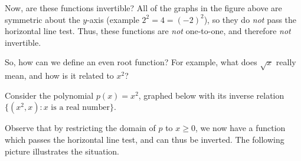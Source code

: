 \documentclass{ximera}
\begin{document}
Now, are these functions invertible? All of the graphs in the figure above are symmetric about the $y$-axis (example $2^2 = 4 = (-2)^2$), so they do {\em not} pass the horizontal line test. Thus, these functions are {\em not} one-to-one, and therefore {\em not} invertible.

So, how can we define an even root function? For example, what does $\sqrt{x}$ really mean, and how is it related to $x^2$?

Consider the polynomial $p(x)=x^2$, graphed below with its inverse relation $\{(x^2, x): x \text{ is a real number}\}$.
\begin{image}
\end{image}

Observe that by restricting the domain of $p$ to $x \geq 0$, we now have a function which passes the horizontal line test, and can thus be inverted. The following picture illustrates the situation.
\end{document}
